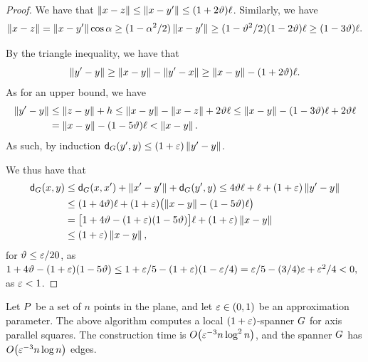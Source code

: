 \documentclass[12pt]{article}%
\begin{document}
\begin{proof}
    We have that
    $\left\| x - z \right\| \leq \left\| x - y' \right\| \leq
    (1+2\vartheta)\ell$. Similarly, we have
    \begin{equation*}
        \dY{\px}{\pz}%
        =%
        \dY{\px}{\py'} \cos \alpha
        \geq%
        (1-\alpha^2/2)\dY{\px}{\py'} 
        \geq 
        (1-\epsA^2/2)(1-2\epsA)\ell
        \geq
        (1-3\epsA)\ell.
    \end{equation*}


    By the triangle inequality, we have that
    \begin{equation*}
        \dY{\py'}{\py}
        \geq%
        \dY{\px}{\py}
        -\dY{\py'}{\px}        
        \geq%
        \dY{\px}{\py}
        - (1+2\epsA)\ell.
    \end{equation*}
    As for an upper bound, we have
    \begin{align*}
      \dY{\py'}{\py}
      &\leq%
        \dY{\pz}{\py} + h%
        \leq%
        \dY{\px}{\py} - \dY{\px}{\pz} +
        2 \epsA \ell
        \leq
        \dY{\px}{\py} - (1-3\epsA)\ell 
        +2 \epsA \ell
      \\&
      = 
      \dY{\px}{\py} - (1-5\epsA)\ell 
      <%
      \dY{\px}{\py}.
    \end{align*}
    As such, by induction
    $\dGZ{\G}{\py'}{\py} \leq (1+\eps) \dY{\py'}{\py}$.

    We thus have that
    \begin{align*}
      \dGZ{\G}{\px}{\py}%
      &\leq%
        \dGZ{\G}{\px}{\px'} + \dY{\px'}{\py'}
        +
        \dGZ{\G}{\py'}{\py}%
        \leq%
        4\epsA \ell
        +
        \ell
        +
        (1+\eps) \dY{\py'}{\py}
      \\&
      \leq%
      (1+4\epsA) \ell
      +
      (1+\eps) \pth{\bigl.
      \dY{\px}{\py} - (1-5\epsA)\ell }
      \\&
      =%
      \bigl[1+4\epsA
      - (1+\eps)(1-5\epsA)\bigr]\ell 
      +
      (1+\eps)
      \dY{\px}{\py}%
      \\&
      \leq%
      (1+\eps)
      \dY{\px}{\py},
    \end{align*}
    for $\vartheta \leq \varepsilon/20$, as
    \begin{math}
        1+4\epsA - (1+\eps)(1-5\epsA)%
        \leq%
        1+\eps/5 - (1+\eps)(1-\eps/4)%
        =%
        \eps/5 -(3/4)\eps + \eps^2/4 < 0,
    \end{math}
    as $\varepsilon < 1$.
\end{proof}

\begin{theorem}
    Let $P$ be a set of $n$ points in the plane, and let
    $\varepsilon \in (0,1)$ be an approximation parameter. The above
    algorithm computes a local $(1+\varepsilon)$-spanner $G$ for axis
    parallel squares.  The construction time is
    $O\pth{\eps^{-3} n \log^2 n}$, and the spanner $G$ has
    $O\pth{\eps^{-3} n \log n}$ edges.
\end{theorem}
\end{document}
